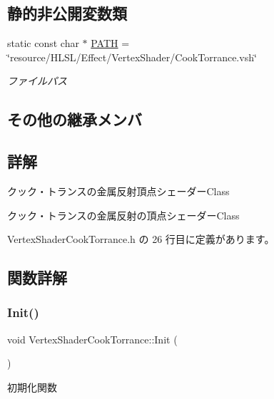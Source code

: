\subsection*{静的非公開変数類}
\begin{DoxyCompactItemize}
\item 
static const char $\ast$ \mbox{\hyperlink{class_vertex_shader_cook_torrance_a8db3a6b351891fc9903c885df5c9111a}{P\+A\+TH}} = \char`\"{}resource/H\+L\+SL/Effect/Vertex\+Shader/Cook\+Torrance.\+vsh\char`\"{}
\begin{DoxyCompactList}\small\item\em ファイルパス \end{DoxyCompactList}\end{DoxyCompactItemize}
\subsection*{その他の継承メンバ}


\subsection{詳解}
クック・トランスの金属反射頂点シェーダー\+Class 

クック・トランスの金属反射の頂点シェーダー\+Class 

 Vertex\+Shader\+Cook\+Torrance.\+h の 26 行目に定義があります。



\subsection{関数詳解}
\mbox{\label{class_vertex_shader_cook_torrance_afab2193c27ca9cdc8490585743cd7ca3}} 
\subsubsection{\texorpdfstring{Init()}{Init()}}
{\footnotesize\ttfamily void Vertex\+Shader\+Cook\+Torrance\+::\+Init (\begin{DoxyParamCaption}{ }\end{DoxyParamCaption})\hspace{0.3cm}{\ttfamily [virtual]}}



初期化関数 


